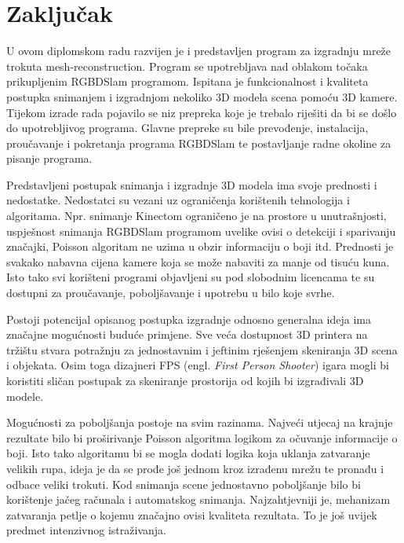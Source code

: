 \newpage
\setcounter{figure}{0}

\section{Zaključak} %
\label{sec:Zaključak}

U ovom diplomskom radu razvijen je i predstavljen program za izgradnju
mreže trokuta mesh-reconstruction. Program se upotrebljava nad oblakom
točaka prikupljenim RGBDSlam programom. Ispitana je funkcionalnost i
kvaliteta postupka snimanjem i izgradnjom nekoliko 3D modela scena
pomoću 3D kamere. Tijekom izrade rada pojavilo se niz prepreka koje je
trebalo riješiti da bi se došlo do upotrebljivog programa. Glavne
prepreke su bile prevođenje, instalacija, proučavanje i pokretanja
programa RGBDSlam te postavljanje radne okoline za pisanje programa. 

Predstavljeni postupak snimanja i izgradnje 3D modela ima svoje
prednosti i nedostatke. Nedostatci su vezani uz ograničenja korištenih
tehnologija i algoritama. Npr. snimanje Kinectom ograničeno je na
prostore u unutrašnjosti, uspješnost snimanja RGBDSlam programom uvelike
ovisi o detekciji i sparivanju značajki, Poisson algoritam ne uzima u
obzir informaciju o boji itd. Prednosti je svakako nabavna cijena
kamere koja se može nabaviti za manje od tisuću kuna. Isto tako svi
korišteni programi objavljeni su pod slobodnim licencama te su dostupni
za proučavanje, poboljšavanje i upotrebu u bilo koje svrhe.  

Postoji potencijal opisanog postupka izgradnje odnosno generalna ideja
ima značajne mogućnosti buduće primjene. Sve veća dostupnost 3D printera 
na tržištu stvara potražnju za jednostavnim i jeftinim
rješenjem skeniranja 3D scena i objekata. Osim toga dizajneri FPS (engl.
\textit{First Person Shooter}) igara mogli bi koristiti sličan postupak
za skeniranje prostorija od kojih bi izgrađivali 3D modele.

Mogućnosti za poboljšanja postoje na svim razinama. Najveći utjecaj na
krajnje rezultate bilo bi proširivanje Poisson algoritma logikom za
očuvanje informacije o boji. Isto tako algoritamu bi se mogla dodati
logika koja uklanja zatvaranje velikih rupa, ideja je da se prođe još
jednom kroz izrađenu mrežu te pronađu i odbace veliki trokuti. Kod
snimanja scene jednostavno poboljšanje bilo bi korištenje jačeg računala
i automatskog snimanja. Najzahtjevniji je, mehanizam zatvaranja petlje o
kojemu značajno ovisi kvaliteta rezultata. To je još uvijek predmet
intenzivnog istraživanja. 

